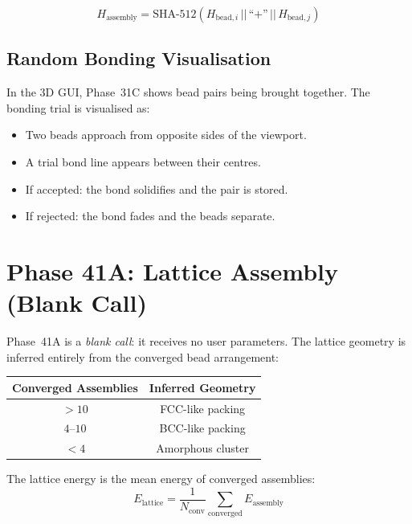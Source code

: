 \documentclass[11pt,a4paper]{article}
\begin{document}
\begin{equation}
  H_\text{assembly} = \text{SHA-512}(H_{\text{bead},i} \,||\, \text{``+''} \,||\, H_{\text{bead},j})
\end{equation}

\subsection{Random Bonding Visualisation}

In the 3D GUI, Phase~31C shows bead pairs being brought together.
The bonding trial is visualised as:

\begin{itemize}
  \item Two beads approach from opposite sides of the viewport.
  \item A trial bond line appears between their centres.
  \item If accepted: the bond solidifies and the pair is stored.
  \item If rejected: the bond fades and the beads separate.
\end{itemize}

\section{Phase 41A: Lattice Assembly (Blank Call)}
\label{sec:phase41A}

Phase~41A is a \emph{blank call}: it receives no user parameters.
The lattice geometry is inferred entirely from the converged bead
arrangement:

\begin{center}
\begin{tabular}{cc}
\toprule
\textbf{Converged Assemblies} & \textbf{Inferred Geometry} \\
\midrule
$> 10$  & FCC-like packing \\
$4$--$10$ & BCC-like packing \\
$< 4$   & Amorphous cluster \\
\bottomrule
\end{tabular}
\end{center}

\noindent The lattice energy is the mean energy of converged assemblies:
\begin{equation}
  E_\text{lattice} = \frac{1}{N_\text{conv}} \sum_{\text{converged}} E_\text{assembly}
\end{equation}
\end{document}

